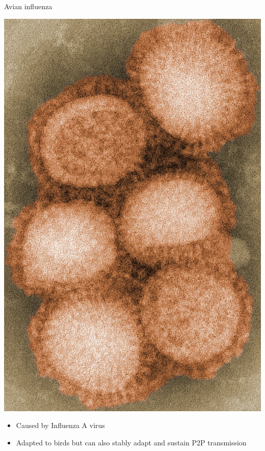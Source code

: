 \documentclass[aspectratio=43]{beamer}
\begin{document}
\begin{frame}{Avian influenza}
  \begin{minipage}{0.4\textwidth}
    \includegraphics[width=1.1\textwidth]{../FIGS/H1N1_navbox}
  \end{minipage}
  \begin{minipage}{0.55\textwidth}
    \begin{itemize}
      \item Caused by Influenza A virus
      \vskip1cm
      \item Adapted to birds but can also stably adapt and sustain P2P transmission
    \end{itemize}
  \end{minipage}
\end{frame}
\end{document}
